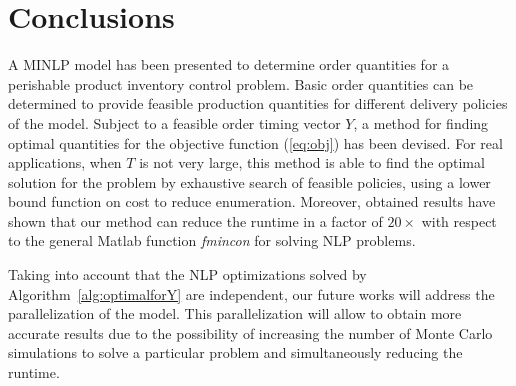 {%


\section{Conclusions}
\label{sec:conclusions}
A MINLP model has been presented to determine order quantities for a perishable product inventory control problem. Basic order quantities can be determined to provide feasible production quantities for different delivery policies of the model. Subject to a feasible order timing vector $Y$, a method for finding optimal quantities for the objective function (\ref{eq:obj}) has been devised. For real applications, when $T$ is not very large, this method is able to find the optimal solution for the problem by exhaustive search of feasible policies, using a lower bound function on cost to reduce enumeration.
Moreover, obtained results have shown that our method can reduce the runtime in a factor of $20\times$ with respect to the general Matlab function \emph{fmincon} for solving NLP problems.


Taking into account that the NLP optimizations solved by Algorithm~\ref{alg:optimalforY} are independent, our future works will address the parallelization of the model. This parallelization will allow to obtain more accurate results due to the possibility of  increasing the number of Monte Carlo simulations to solve a particular problem and simultaneously reducing the runtime.





}
